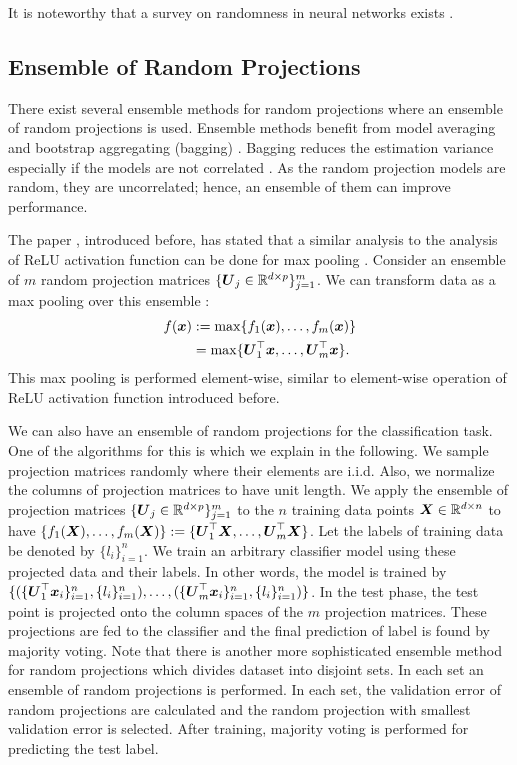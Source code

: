 \documentclass{article}
\def\b{\ensuremath\boldsymbol}
\begin{document}
It is noteworthy that a survey on randomness in neural networks exists \cite{scardapane2017randomness}. 


\subsection{Ensemble of Random Projections}

There exist several ensemble methods for random projections where an ensemble of random projections is used. Ensemble methods benefit from model averaging \cite{hoeting1999bayesian} and bootstrap aggregating (bagging) \cite{breiman1996bagging}. Bagging reduces the estimation variance especially if the models are not correlated \cite{ghojogh2019theory}. As the random projection models are random, they are uncorrelated; hence, an ensemble of them can improve performance. 

The paper \cite{giryes2016deep}, introduced before, has stated that a similar analysis to the analysis of ReLU activation function can be done for max pooling \cite{scherer2010evaluation}.
Consider an ensemble of $m$ random projection matrices $\{\b{U}_j \in \mathbb{R}^{d \times p}\}_{j=1}^m$. We can transform data as a max pooling over this ensemble \cite{karimi2017ensembles}: 
\begin{align}
f(\b{x}) &:= \max\{f_1(\b{x}), \dots, f_m(\b{x})\} \nonumber\\
&= \max\{\b{U}_1^\top \b{x}, \dots, \b{U}_m^\top \b{x}\}.
\end{align}
This max pooling is performed element-wise, similar to element-wise operation of ReLU activation function introduced before. 

We can also have an ensemble of random projections for the classification task. One of the algorithms for this is \cite{schclar2009random} which we explain in the following. 
We sample projection matrices randomly where their elements are i.i.d. Also, we normalize the columns of projection matrices to have unit length.
We apply the ensemble of projection matrices $\{\b{U}_j \in \mathbb{R}^{d \times p}\}_{j=1}^m$ to the $n$ training data points $\b{X} \in \mathbb{R}^{d \times n}$ to have $\{f_1(\b{X}), \dots, f_m(\b{X})\} := \{\b{U}_1^\top \b{X}, \dots, \b{U}_m^\top \b{X}\}$. 
Let the labels of training data be denoted by $\{l_i\}_{i=1}^n$. 
We train an arbitrary classifier model using these projected data and their labels. In other words, the model is trained by $\{(\{\b{U}_1^\top \b{x}_i\}_{i=1}^n, \{l_i\}_{i=1}^n), \dots, (\{\b{U}_m^\top \b{x}_i\}_{i=1}^n, \{l_i\}_{i=1}^n)\}$. In the test phase, the test point is projected onto the column spaces of the $m$ projection matrices. These projections are fed to the classifier and the final prediction of label is found by majority voting. 
Note that there is another more sophisticated ensemble method for random projections \cite{cannings2015random} which divides dataset into disjoint sets. In each set an ensemble of random projections is performed. In each set, the validation error of random projections are calculated and the random projection with smallest validation error is selected. After training, majority voting is performed for predicting the test label. 
\end{document}
